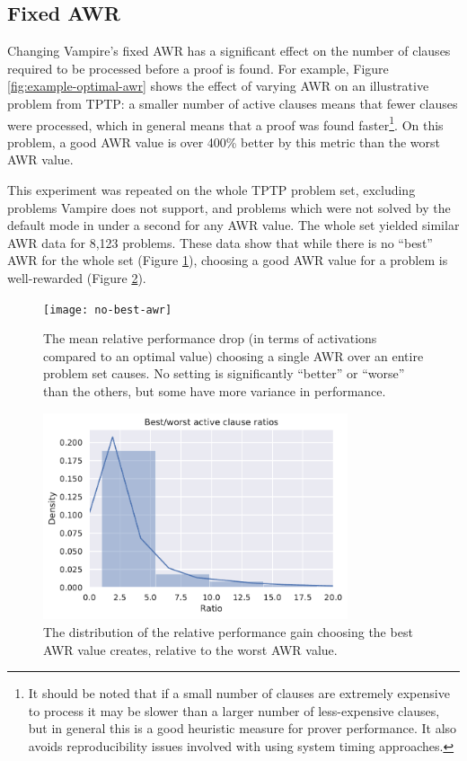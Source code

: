\documentclass{llncs}
\begin{document}
\subsection{Fixed AWR}
Changing Vampire's fixed AWR has a significant effect on the number of clauses required to be processed before a proof is found.
For example, Figure \ref{fig:example-optimal-awr} shows the effect of varying AWR on an illustrative problem from TPTP: a smaller number of active clauses means that fewer clauses were processed, which in general means that a proof was found faster\footnote{
It should be noted that if a small number of clauses are extremely expensive to process it may be slower than a larger number of less-expensive clauses, but in general this is a good heuristic measure for prover performance.
It also avoids reproducibility issues involved with using system timing approaches.
}.
On this problem, a good AWR value is over 400\% better by this metric than the worst AWR value.

This experiment was repeated on the whole TPTP problem set, excluding problems Vampire does not support, and problems which were not solved by the default mode in under a second for any AWR value.
The whole set yielded similar AWR data for 8,123 problems.
These data show that while there is no ``best'' AWR for the whole set (Figure \ref{fig:no-best-awr}), choosing a good AWR value for a problem is well-rewarded (Figure \ref{fig:optimal-awr-improvement}).

\begin{figure}
	\centering
	\texttt{[image: no-best-awr]}
	\caption{The mean relative performance drop (in terms of activations compared to an optimal value) choosing a single AWR over an entire problem set causes. No setting is significantly ``better'' or ``worse'' than the others, but some have more variance in performance.}
	\label{fig:no-best-awr}
\end{figure}

\begin{figure}
	\centering
	\includegraphics[width=0.8\textwidth]{optimal-awr-improvement}
	\caption{The distribution of the relative performance gain choosing the best AWR value creates, relative to the worst AWR value.}
	\label{fig:optimal-awr-improvement}
\end{figure}
\end{document}
